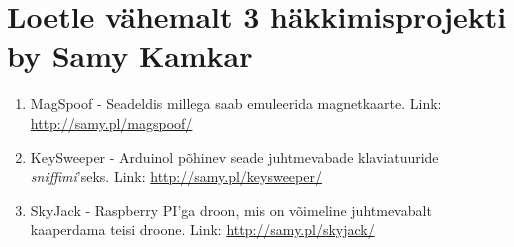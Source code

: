 \documentclass{article}
\begin{document}

\section{Loetle vähemalt 3 häkkimisprojekti by Samy Kamkar}
\begin{enumerate}
	\item{MagSpoof - Seadeldis millega saab emuleerida magnetkaarte. Link: \url{http://samy.pl/magspoof/}}
	\item{KeySweeper - Arduinol põhinev seade juhtmevabade klaviatuuride \textit{sniffimi}'seks. Link: \url{http://samy.pl/keysweeper/}}
	\item{SkyJack - Raspberry PI'ga droon, mis on võimeline juhtmevabalt kaaperdama teisi droone. Link: \url{http://samy.pl/skyjack/}}
\end{enumerate}
\end{document}
